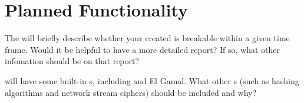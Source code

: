 \section{Planned Functionality}

\begin{question}
The \cry{} \cf{} will briefly describe whether your created
\ca{} is breakable within a given time frame.
Would it be helpful to have a more detailed report?
If so, what other infomation should be on that report?
\end{question}

\begin{question}
\cry{} will have some built-in \ca s,
including \rsa{} and El Gamal.
What other \ca s
(such as hashing algorithms and network stream ciphers)
should be included and why?
\end{question}
